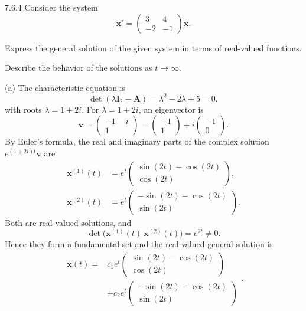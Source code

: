 \documentclass[11pt,oneside]{article}
\begin{document}
\begin{problem}{7.6.4}
Consider the system
\[
    \mathbf{x}'=
    \begin{pmatrix}
        3&4\\
        -2&-1
    \end{pmatrix}\mathbf{x}.
\]
\begin{problemsubparts}
    \item Express the general solution of the given system in terms of real-valued functions.
    \item Describe the behavior of the solutions as $t\to\infty$.
\end{problemsubparts}
\end{problem}

\begin{solution}
\noindent\textup{(a)} The characteristic equation is
\[
    \det(\lambda\mathbf{I}_2-\mathbf{A})
    =\lambda^2-2\lambda+5=0,
\]
with roots $\lambda=1\pm2i$. For $\lambda=1+2i$, an eigenvector is
\[
    \mathbf{v}=\begin{pmatrix}-1-i\\1\end{pmatrix}
    =\begin{pmatrix}-1\\1\end{pmatrix}
      +i\begin{pmatrix}-1\\0\end{pmatrix}.
\]
By Euler's formula, the real and imaginary parts of the complex solution $e^{(1+2i)t}\mathbf{v}$ are
\[
\begin{aligned}
    \mathbf{x}^{(1)}(t)
       &=e^t\begin{pmatrix}
           \sin(2t)-\cos(2t)\\
           \cos(2t)
         \end{pmatrix},\\
    \mathbf{x}^{(2)}(t)
       &=e^t\begin{pmatrix}
           -\sin(2t)-\cos(2t)\\
           \sin(2t)
         \end{pmatrix}.
\end{aligned}
\]
Both are real-valued solutions, and
\[
    \det\bigl(\mathbf{x}^{(1)}(t)\ \mathbf{x}^{(2)}(t)\bigr)
    =e^{2t}\ne0.
\]
Hence they form a fundamental set and the real-valued general solution is
\[
    \boxed{
    \begin{aligned}
        \mathbf{x}(t)
        ={}&c_1e^t\begin{pmatrix}
            \sin(2t)-\cos(2t)\\
            \cos(2t)
        \end{pmatrix}\\
        &+c_2e^t\begin{pmatrix}
            -\sin(2t)-\cos(2t)\\
            \sin(2t)
        \end{pmatrix}
    \end{aligned}
    }.
\]


\end{solution}
\end{document}
